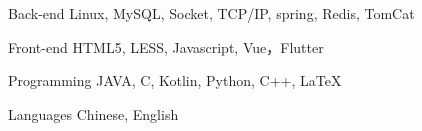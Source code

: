 

\begin{cvskills}

  \cvskill
    {Back-end} %
    {Linux, MySQL, Socket, TCP/IP, spring, Redis, TomCat} %

  \cvskill
    {Front-end} %
    {HTML5, LESS, Javascript, Vue，Flutter} %

  \cvskill
    {Programming} %
    {JAVA, C, Kotlin, Python, C++, LaTeX} %

  \cvskill
    {Languages} %
    {Chinese, English} %

\end{cvskills}
